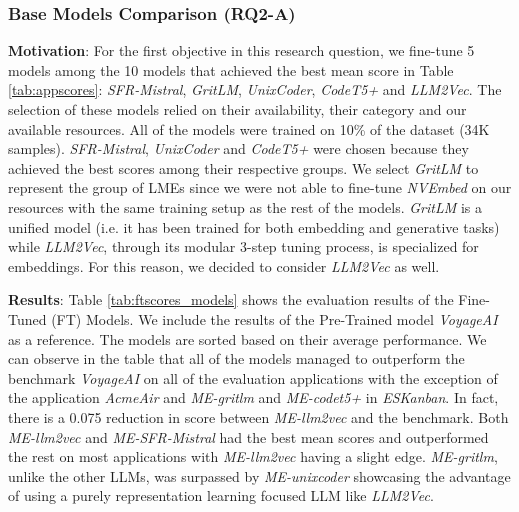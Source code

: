 \subsubsection{Base Models Comparison (RQ2-A)}
\phantom{1}

\textbf{Motivation}: For the first objective in this research question, we fine-tune 5 models among the 10 models that achieved the best mean score in Table \ref{tab:appscores}: \textit{SFR-Mistral}, \textit{GritLM}, \textit{UnixCoder}, \textit{CodeT5+} and \textit{LLM2Vec}. The selection of these models relied on their availability, their category and our available resources. All of the models were trained on 10\% of the dataset (34K samples). \textit{SFR-Mistral}, \textit{UnixCoder} and \textit{CodeT5+} were chosen because they achieved the best scores among their respective groups. We select \textit{GritLM} to represent the group of LMEs since we were not able to fine-tune \textit{NVEmbed} on our resources with the same training setup as the rest of the models. \textit{GritLM} is a unified model (i.e. it has been trained for both embedding and generative tasks) while \textit{LLM2Vec}, through its modular 3-step tuning process, is specialized for embeddings. For this reason, we decided to consider \textit{LLM2Vec} as well.


\textbf{Results}: Table \ref{tab:ftscores_models} shows the evaluation results of the Fine-Tuned (FT) Models. We include the results of the Pre-Trained model \textit{VoyageAI} as a reference. The models are sorted based on their average performance. We can observe in the table that all of the models managed to outperform the benchmark \textit{VoyageAI} on all of the evaluation applications with the exception of the application \textit{AcmeAir} and \textit{ME-gritlm} and \textit{ME-codet5+} in \textit{ESKanban}. In fact, there is a 0.075 reduction in score between \textit{ME-llm2vec} and the benchmark. Both \textit{ME-llm2vec} and \textit{ME-SFR-Mistral} had the best mean scores and outperformed the rest on most applications with \textit{ME-llm2vec} having a slight edge. \textit{ME-gritlm}, unlike the other LLMs, was surpassed by \textit{ME-unixcoder} showcasing the advantage of using a purely representation learning focused LLM like \textit{LLM2Vec}. 






